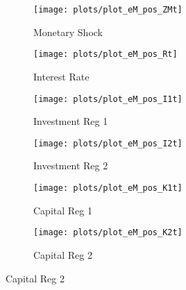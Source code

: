 \documentclass[../thesis.tex]{subfiles}
\begin{document}
	\begin{figure}[h!]
		\centering


		\begin{subfigure}[b]{0.26\textwidth}
			\centering
			\texttt{[image: plots/plot\_eM\_pos\_ZMt]}
			\caption{\footnotesize Monetary Shock}
			\label{fig:ZMt-ZMt}
		\end{subfigure}
		\hfill
		\begin{subfigure}[b]{0.26\textwidth}
			\centering
			\texttt{[image: plots/plot\_eM\_pos\_Rt]}
			\caption{\footnotesize Interest Rate}
			\label{fig:ZMt-Rt}
		\end{subfigure}
		\hfill
		\begin{subfigure}[b]{0.26\textwidth}
			\centering
			\texttt{[image: plots/plot\_eM\_pos\_I1t]}
			\caption{\footnotesize Investment Reg 1}
			\label{fig:ZMt-I1t}
		\end{subfigure}
		\hfill		
		\vspace*{0.5cm}

		
		\begin{subfigure}[b]{0.26\textwidth}
			\centering
			\texttt{[image: plots/plot\_eM\_pos\_I2t]}
			\caption{\footnotesize Investment Reg 2}
			\label{fig:ZMt-I2t}
		\end{subfigure}
		\hfill
		\begin{subfigure}[b]{0.26\textwidth}
			\centering
			\texttt{[image: plots/plot\_eM\_pos\_K1t]}
			\caption{\footnotesize Capital Reg 1}
			\label{fig:ZMt-K1t}
		\end{subfigure}
		\hfill
		\begin{subfigure}[b]{0.26\textwidth}
			\centering
			\texttt{[image: plots/plot\_eM\_pos\_K2t]}
			\caption{\footnotesize Capital Reg 2}
			\label{fig:ZMt-K2t}
		\end{subfigure}
		\hfill
		\vspace*{0.5cm}

		

\end{figure}
\end{document}
